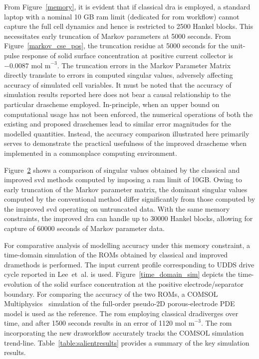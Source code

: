 \begin{figure}
	\caption{}
	\label{cputime}
\end{figure}

From Figure~\ref{memory}, it is evident that if classical \gls{dra}
is employed, a standard laptop with a nominal 10 GB \gls{ram} limit (dedicated
for \gls{rom} workflow) cannot capture the full cell dynamics and hence
is restricted to 2500 Hankel blocks. This necessitates early truncation
of Markov parameters at 5000 seconds. From Figure~\ref{markov_cse_pos},
the truncation residue at 5000 seconds for the unit-pulse response
of solid surface concentration at positive current collector is $-0.0087 \text{ mol m}^{-\text{3}}$.
The truncation errors in the Markov Parameter Matrix directly translate
to errors in computed singular values, adversely affecting accuracy
of simulated cell variables. It must be noted that the accuracy of
simulation results reported here does not bear a causal relationship
to the particular \gls{dra}scheme employed. In-principle, when an upper
bound on computational usage has not been enforced, the numerical
operations of both the existing and proposed \gls{dra}schemes lead to similar
error magnitudes for the modelled quantities. Instead, the accuracy
comparison illustrated here primarily serves to demonstrate the practical
usefulness of the improved \gls{dra}scheme when implemented in a commonplace
computing environment.

\begin{figure}
	\caption{}
	\label{truncated}
\end{figure}

Figure~\ref{truncated} shows a comparison of singular values obtained
by the classical and improved \gls{svd} methods computed by imposing a \gls{ram}
limit of 10GB. Owing to early truncation of the Markov parameter matrix,
the dominant singular values computed by the conventional method differ
significantly from those computed by the improved \gls{svd} operating on
untruncated data. With the same memory constraints, the improved \gls{dra}
can handle up to 30000 Hankel blocks, allowing for capture of 60000
seconds of Markov parameter data.

For comparative analysis of modelling accuracy under this memory constraint,
a time-domain simulation of the ROMs obtained by classical and improved
\gls{dra}methods is performed. The input current profile corresponding
to UDDS drive cycle reported in Lee~et~al. \cite{LeeChemistruckPlett2012}
is used. Figure~\ref{time_domain_sim} depicts the time-evolution
of the solid surface concentration at the positive electrode/separator
boundary. For comparing the accuracy of the two ROMs, a COMSOL Multiphysics~\cite{Multiphysics2012}
simulation of the full-order pseudo-2D porous-electrode PDE model
is used as the reference. The \gls{rom} employing classical \gls{dra}diverges
over time, and after 1500 seconds results in an error of 1120$\text{ mol m}^{-\text{3}}$$.$
The \gls{rom} incorporating the new \gls{dra}workflow accurately tracks the COMSOL
simulation trend-line. Table~\ref{table:salientresults} provides
a summary of the key simulation results.

